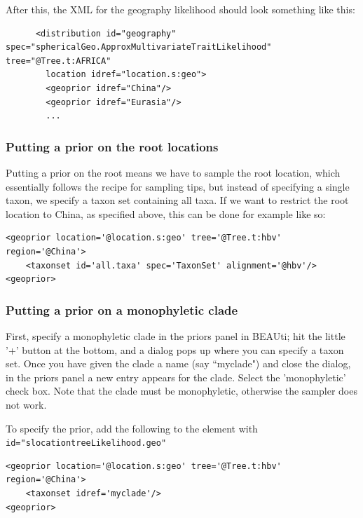 \documentclass{article}
\begin{document}
After this, the XML for the geography likelihood should look something like this:

\begin{verbatim}
      <distribution id="geography" spec="sphericalGeo.ApproxMultivariateTraitLikelihood" tree="@Tree.t:AFRICA" 
		location idref="location.s:geo">
        <geoprior idref="China"/>
        <geoprior idref="Eurasia"/>
        ...
\end{verbatim}


\subsubsection*{Putting a prior on the root locations}

Putting a prior on the root means we have to sample the root location, which essentially follows the recipe for sampling tips, but instead of specifying a single taxon, we specify a taxon set containing all taxa. If we want to restrict the root location to China, as specified above, this can be done for example like so:

\begin{verbatim}
<geoprior location='@location.s:geo' tree='@Tree.t:hbv' region='@China'>
	<taxonset id='all.taxa' spec='TaxonSet' alignment='@hbv'/>
<geoprior>
\end{verbatim}


\subsubsection*{Putting a prior on a monophyletic clade}

First, specify a monophyletic clade in the priors panel in BEAUti; hit the little '+' button at the bottom, and a dialog pops up where you can specify a taxon set. Once you have given the clade a name (say ``myclade") and close the dialog, in the priors panel a new entry appears for the clade. Select the 'monophyletic' check box. Note that the clade must be monophyletic, otherwise the sampler does not work.

To specify the prior, add the following to the element with {\tt id="slocationtreeLikelihood.geo"}

\begin{verbatim}
<geoprior location='@location.s:geo' tree='@Tree.t:hbv' region='@China'>
	<taxonset idref='myclade'/>
<geoprior>
\end{verbatim}







\end{document}
